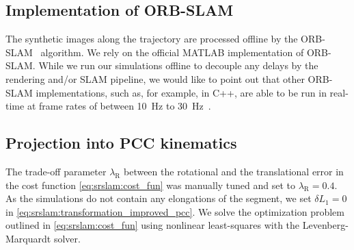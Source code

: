 \subsection{Implementation of ORB-SLAM}
The synthetic images along the trajectory are processed offline by the ORB-SLAM~\cite{mur2017orb} algorithm. We rely on the official MATLAB implementation of ORB-SLAM. While we run our simulations offline to decouple any delays by the rendering and/or \gls{SLAM} pipeline, we would like to point out that other ORB-SLAM implementations, such as, for example, in C++, are able to be run in real-time at frame rates of between \SI{10}{Hz} to \SI{30}{Hz}~\cite{mur2017orb}.

\subsection{Projection into PCC kinematics}
The trade-off parameter $\lambda_\mathrm{R}$ between the rotational and the translational error in the cost function \eqref{eq:srslam:cost_fun} was manually tuned and set to $\lambda_\mathrm{R}=0.4$.
As the simulations do not contain any elongations of the segment, we set $\delta L_1 = 0$ in \eqref{eq:srslam:transformation_improved_pcc}. 
We solve the optimization problem outlined in \eqref{eq:srslam:cost_fun} using nonlinear least-squares with the Levenberg-Marquardt solver. %

